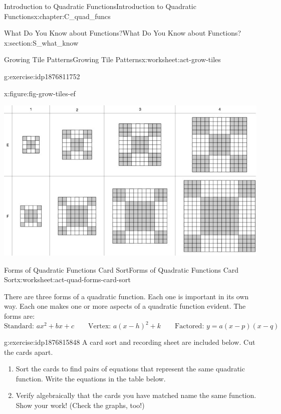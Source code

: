 \documentclass[oneside,10pt,]{book}
\numberwithin{equation}{chapter}
\begin{document}
\begin{chapterptx}{Introduction to Quadratic Functions}{}{Introduction to Quadratic Functions}{}{}{x:chapter:C_quad_funcs}
\begin{sectionptx}{What Do You Know about Functions?}{}{What Do You Know about Functions?}{}{}{x:section:S_what_know}
\begin{worksheet-subsection}{Growing Tile Patterns}{}{Growing Tile Patterns}{}{}{x:worksheet:act-grow-tiles}
\begin{divisionexercise}{8}{}{}{g:exercise:idp1876811752}
\begin{figureptx}{}{x:figure:fig-grow-tiles-ef}{}
\begin{image}{0.05}{0.9}{0.05}
\includegraphics[width=\linewidth]{external/grow-tiles-ef.pdf}
\end{image}%
\tcblower
\end{figureptx}%
\end{divisionexercise}%
\end{worksheet-subsection}
\restoregeometry
%
%
\typeout{************************************************}
\typeout{************************************************}
%
\begin{worksheet-subsection}{Forms of Quadratic Functions Card Sort}{}{Forms of Quadratic Functions Card Sort}{}{}{x:worksheet:act-quad-forms-card-sort}
\begin{introduction}{}%
There are three forms of a quadratic function. Each one is important in its own way. Each one makes one or more aspects of a quadratic function evident. The forms are:%
\begin{equation*}
\text{Standard: } ax^2 + bx + c \qquad \text{Vertex: } a(x - h)^2 + k \qquad \text{Factored: } y = a(x - p)(x - q)
\end{equation*}
%
\end{introduction}%
\begin{divisionexercise}{1}{}{}{g:exercise:idp1876815848}%
A card sort and recording sheet are included below. Cut the cards apart.%
\begin{enumerate}[font=\bfseries,label=(\alph*),ref=\alph*]
\item{}Sort the cards to find pairs of equations that represent the same quadratic function. Write the equations in the table below.%
\item{}Verify algebraically that the cards you have matched name the same function. Show your work! (Check the graphs, too!)%

\end{enumerate}
\end{divisionexercise}
\end{worksheet-subsection}
\end{sectionptx}
\end{chapterptx}
\end{document}
